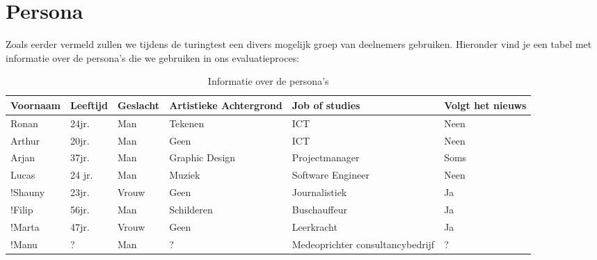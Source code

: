 \section{Persona}
Zoals eerder vermeld zullen we tijdens de turingtest een divers mogelijk groep van deelnemers gebruiken. Hieronder vind je een tabel met informatie over de persona's die we gebruiken in ons evaluatieproces:

\begin{table}[htbp]
    \centering
    \begin{tabular}{|p{2cm}|p{1.3cm}|p{1.4cm}|p{2.8cm}|p{4cm}|p{1.5cm}|}
        \hline
        Voornaam & Leeftijd & Geslacht & Artistieke Achtergrond  & Job of studies & Volgt het nieuws \\
        \hline
        Ronan & 24jr. & Man & Tekenen &  ICT  & Neen  \\
        
        Arthur & 20jr. & Man & Geen & ICT & Neen \\ 
        
        Arjan & 37jr. & Man & Graphic Design & Projectmanager & Soms \\
        
        Lucas & 24 jr. & Man & Muziek & Software Engineer & Neen \\
        
        !Shauny & 23jr. & Vrouw & Geen & Journalistiek & Ja \\
 
        !Filip & 56jr. & Man & Schilderen & Buschauffeur &  Ja \\

        !Marta & 47jr. & Vrouw & Geen & Leerkracht & Ja \\

        !Manu & ? & Man & ? & Medeoprichter consultancybedrijf & ? \\      
        \hline

    \end{tabular}
    \caption{Informatie over de persona's}
    \label{table:persona}
\end{table}

